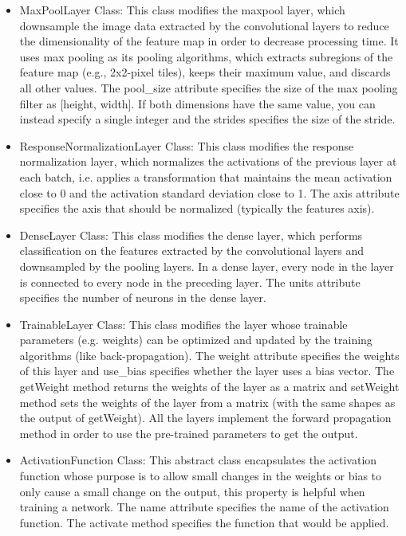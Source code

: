 \documentclass[parskip=full]{scrartcl}
\begin{document}
\begin{itemize}
	\item MaxPoolLayer Class: This class modifies the maxpool layer, which downsample the image data extracted by the convolutional layers to reduce the dimensionality of the feature map in order to decrease processing time. It uses max pooling as its pooling algorithms, which extracts subregions of the feature map (e.g., 2x2-pixel tiles), keeps their maximum value, and discards all other values.
The pool\_size attribute specifies the size of the max pooling filter as [height, width]. If both dimensions have the same value, you can instead specify a single integer and the strides specifies the size of the stride.
	\item ResponseNormalizationLayer Class: This class modifies the response normalization layer, which normalizes the activations of the previous layer at each batch, i.e. applies a transformation that maintains the mean activation close to 0 and the activation standard deviation close to 1. The axis attribute specifies the axis that should be normalized (typically the features axis).
	\item DenseLayer Class: This class modifies the dense layer, which performs classification on the features extracted by the convolutional layers and downsampled by the pooling layers. In a dense layer, every node in the layer is connected to every node in the preceding layer.
The units attribute specifies the number of neurons in the dense layer.
	\item TrainableLayer Class: This class modifies the layer whose trainable parameters (e.g. weights) can be optimized and updated by the training algorithms (like back-propagation). The weight attribute specifies the weights of this layer and use\_bias specifies whether the layer uses a bias vector. The getWeight method returns the weights of the layer as a matrix and setWeight method sets the weights of the layer from a matrix (with the same shapes as the output of getWeight). All the layers implement the forward propagation method in order to use the pre-trained parameters to get the output. 
	\item ActivationFunction Class: This abstract class encapsulates the activation function whose purpose is to allow small changes in the weights or bias to only cause a small change on the output, this property is helpful when training a network.
The name attribute specifies the name of the activation function.
The activate method specifies the function that would be applied.
\end{itemize}
\end{document}
